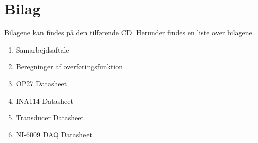 \chapter{Bilag}
Bilagene kan findes på den tilførende CD. Herunder findes en liste over bilagene. 

\begin{enumerate}
	\item Samarbejdsaftale
	\item Beregninger af overføringsfunktion 
	\item OP27 Datasheet
	\item INA114 Datasheet
	\item Transducer Datasheet
	\item NI-6009 DAQ Datasheet  
\end{enumerate} 